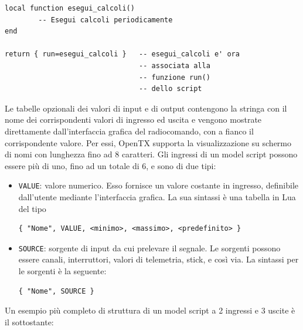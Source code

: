 \documentclass[a4paper, 12pt]{report}
\begin{document}
\begin{lstlisting}
local function esegui_calcoli()
        -- Esegui calcoli periodicamente
end

return { run=esegui_calcoli }   -- esegui_calcoli e' ora
                                -- associata alla
                                -- funzione run()
                                -- dello script
\end{lstlisting}

Le tabelle opzionali dei valori di input e di output contengono la stringa con il nome dei corrispondenti valori di ingresso ed uscita e vengono mostrate direttamente dall'interfaccia grafica del radiocomando, con a fianco il corrispondente valore. Per essi, OpenTX supporta la visualizzazione su schermo di nomi con lunghezza fino ad 8 caratteri. Gli ingressi di un model script possono essere più di uno, fino ad un totale di 6, e sono di due tipi:
\begin{itemize}
        \item \texttt{VALUE}: valore numerico. Esso fornisce un valore costante in ingresso, definibile dall'utente mediante l'interfaccia grafica. La sua sintassi è una tabella in Lua del tipo 
\begin{lstlisting}
{ "Nome", VALUE, <minimo>, <massimo>, <predefinito> }
\end{lstlisting}
        \item \texttt{SOURCE}: sorgente di input da cui prelevare il segnale. Le sorgenti possono essere canali, interruttori, valori di telemetria, stick, e così via. La sintassi per le sorgenti è la seguente: 
\begin{lstlisting}
{ "Nome", SOURCE }
\end{lstlisting}
\end{itemize}

Un esempio più completo di struttura di un model script a 2 ingressi e 3 uscite è il sottostante:
\end{document}

